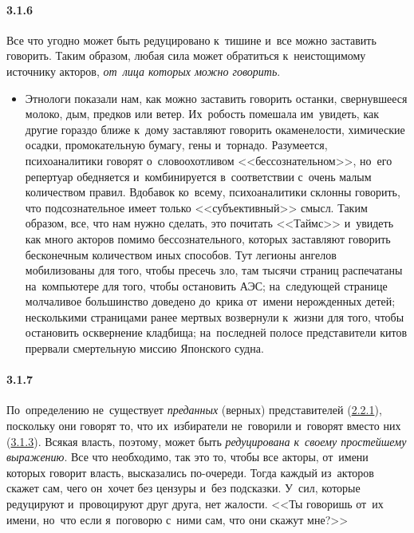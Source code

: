 \paragraph{3.1.6}\hypertarget{par:3.1.6}{} Все что угодно может быть редуцировано к~тишине и~все можно заставить говорить. Таким образом, любая сила может обратиться к~неистощимому источнику акторов, {\itshape от~лица которых можно говорить}.
	\begin{itemize}
	\item 
	Этнологи показали нам, как можно заставить говорить останки, свернувшееся молоко, дым, предков или ветер. Их~робость помешала им~увидеть, как другие гораздо ближе к~дому заставляют говорить окаменелости, химические осадки, промокательную бумагу, гены и~торнадо. Разумеется, психоаналитики говорят о~словоохотливом <<бессознательном>>, но~его репертуар обедняется и~комбинируется в~соответствии с~очень малым количеством правил. Вдобавок ко~всему, психоаналитики склонны говорить, что подсознательное имеет только <<субъективный>> смысл. Таким образом, все, что нам нужно сделать, это почитать <<Таймс>> и~увидеть как много акторов помимо бессознательного, которых заставляют говорить бесконечным количеством иных способов. Тут легионы ангелов мобилизованы для того, чтобы пресечь зло, там тысячи страниц распечатаны на~компьютере для того, чтобы остановить АЭС; на~следующей странице молчаливое большинство доведено до~крика от~имени нерожденных детей; несколькими страницами ранее мертвых возвернули к~жизни для того, чтобы остановить осквернение кладбища; на~последней полосе представители китов прервали смертельную миссию Японского судна.
	\end{itemize}

\paragraph{3.1.7}\hypertarget{par:3.1.7}{} По~определению не~существует {\itshape преданных} (верных) представителей (\hyperlink{par:2.2.1}{2.2.1}), поскольку они говорят то, что их~избиратели не~говорили и~говорят вместо них (\hyperlink{par:3.1.3}{3.1.3}). Всякая власть, поэтому, может быть {\itshape редуцирована к~своему простейшему выражению}. Все что необходимо, так это то, чтобы все акторы, от~имени которых говорит власть, высказались по-очереди. Тогда каждый из~акторов скажет сам, чего он~хочет без цензуры и~без подсказки. У~сил, которые редуцируют и~провоцируют друг друга, нет жалости. <<Ты говоришь от~их имени, но~что если я~поговорю с~ними сам, что они скажут мне?>>

